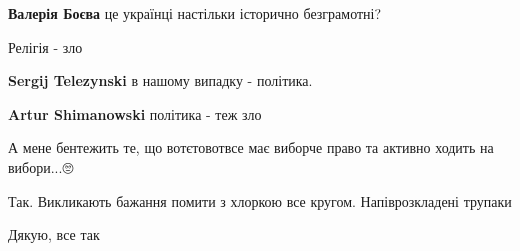 \begin{itemize}
\begin{itemize}
\textbf{Валерія Боєва} це українці настільки історично безграмотні?
\end{itemize}

 
Релігія - зло

\begin{itemize}
 
\textbf{Sergij Telezynski} в нашому випадку - політика.

 
\textbf{Artur Shimanowski} політика - теж зло
\end{itemize}

 
А мене бентежить те, що вотєтовотвсе має виборче право та активно ходить на вибори...🙄

 
Так. Викликають бажання помити з хлоркою все кругом. Напіврозкладені трупаки

 
Дякую, все так


\end{itemize}
